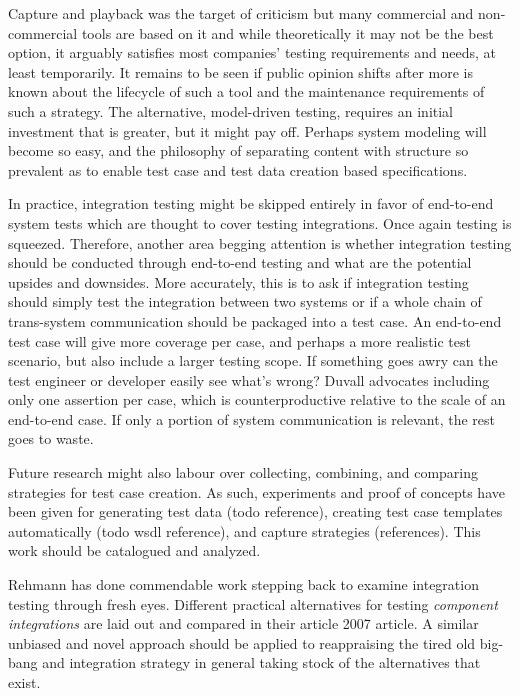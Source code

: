 \documentclass[12pt,a4paper,oneside,pdftex]{report}
\begin{document}
{%

Capture and playback was the target of criticism but many commercial and non-commercial tools are based on it and while theoretically it may not be the best option, it arguably satisfies most companies' testing requirements and needs, at least temporarily. It remains to be seen if public opinion shifts after more is known about the lifecycle of such a tool and the maintenance requirements of such a strategy. The alternative, model-driven testing, requires an initial investment that is greater, but it might pay off. Perhaps system modeling will become so easy, and the philosophy of separating content with structure so prevalent as to enable test case and test data creation based specifications.

In practice, integration testing might be skipped entirely in favor of end-to-end system tests which are thought to cover testing integrations. Once again testing is squeezed. Therefore, another area begging attention is whether integration testing should be conducted through end-to-end testing and what are the potential upsides and downsides. More accurately, this is to ask if integration testing should simply test the integration between two systems or if a whole chain of trans-system communication should be packaged into a test case. An end-to-end test case will give more coverage per case, and perhaps a more realistic test scenario, but also include a larger testing scope. If something goes awry can the test engineer or developer easily see what's wrong? Duvall advocates including only one assertion per case, which is counterproductive relative to the scale of an end-to-end case. If only a portion of system communication is relevant, the rest goes to waste.

Future research might also labour over collecting, combining, and comparing strategies for test case creation. As such, experiments and proof of concepts have been given for generating test data (todo reference), creating test case templates automatically (todo wsdl reference), and capture strategies (references). This work should be catalogued and analyzed.

Rehmann has done commendable work stepping back to examine integration testing through fresh eyes. Different practical alternatives for testing \emph{component integrations} are laid out and compared in their article 2007 article. A similar unbiased and novel approach should be applied to reappraising the tired old big-bang and integration strategy in general taking stock of the alternatives that exist.

}
\end{document}
